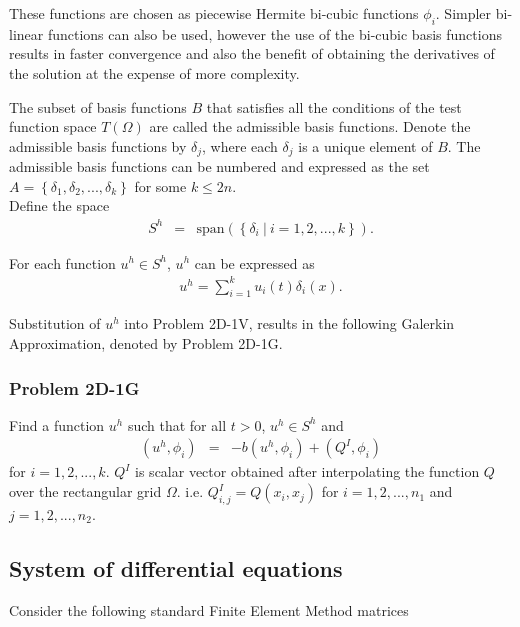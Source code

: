 \documentclass[../../main.tex]{subfiles}
\begin{document}
These functions are chosen as piecewise Hermite bi-cubic functions $\phi_i$. Simpler bi-linear functions can also be used, however the use of the bi-cubic basis functions results in faster convergence and also the benefit of obtaining the derivatives of the solution at the expense of more complexity.

The subset of basis functions $B$ that satisfies all the conditions of the test function space $T(\Omega)$ are called the admissible basis functions. Denote the admissible basis functions by $\delta_j$, where each $\delta_j$ is a unique element of $B$. The admissible basis functions can be numbered and expressed as the set $A = \left \{\delta_1, \delta_2,..., \delta_k \right\}$ for some $k \leq 2n$.\\ 

Define the space
\begin{eqnarray*}
S^h & = & \textrm{span}\left(\left\{\delta_i \ | \ i = 1,2,...,k \right\} \right).
\end{eqnarray*}

For each function $u^h \in S^h$, $u^h$ can be expressed as
\begin{eqnarray*}
	u^h = \sum_{i = 1}^{k} u_i(t) \delta_{i}(x).
\end{eqnarray*}

Substitution of $u^h$ into Problem 2D-1V, results in the following Galerkin Approximation, denoted by Problem 2D-1G.

\subsubsection{Problem 2D-1G}
Find a function $u^h$ such that for all $t>0$, $u^h \in S^h$ and
\begin{eqnarray*}
	(u^h, \phi_i) & = & -b(u^h,\phi_i) + (Q^I, \phi_i)
\end{eqnarray*} for $i = 1,2,...,k$. $Q^I$ is scalar vector obtained after interpolating the function $Q$ over the rectangular grid $\Omega$. i.e. $Q^I_{i,j} = Q(x_i,x_j)$ for $i = 1,2,...,n_1$ and $j = 1,2,...,n_2$.

\subsection{System of differential equations}\label{ssec:2DFEM:DE}

Consider the following standard Finite Element Method matrices
\end{document}
